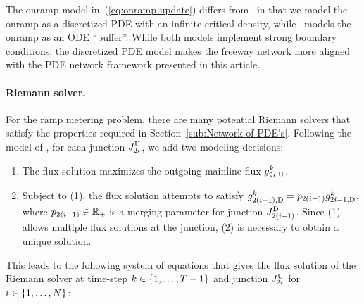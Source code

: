 The onramp model in~(\ref{eq:onramp-update}) differs from~\cite{Monache2013,Walid}
in that we model the onramp as a discretized PDE with an infinite
critical density, while~\cite{Monache2013,Walid} models the onramp
as an ODE ``buffer''. While both models implement strong boundary
conditions, the discretized PDE model makes the freeway network more
aligned with the PDE network framework presented in this article.


\paragraph{Riemann solver.}

For the ramp metering problem, there are many potential Riemann solvers
that satisfy the properties required in Section~\ref{sub:Network-of-PDE's}.
Following the model of \cite{Walid,ML}, for each junction $J_{2i}^{\text{U}}$,
we add two modeling decisions:
\begin{enumerate}
\item The flux solution maximizes the outgoing mainline flux $g_{2i,\text{U}}^{k}$.
\item Subject to (1), the flux solution attempts to satisfy $\fout{2\left(\link-1\right)}{\tind}=p_{2(\link-1)}\fout{2\link-1}{\tind}$,
where $p_{2(i-1)}\in\mathbb{R}_{+}$ is a merging parameter for
junction $\jdown{2\left(\link-1\right)}$. Since (1) allows multiple
flux solutions at the junction, (2) is necessary to obtain a unique
solution.
\end{enumerate}
This leads to the following system of equations that gives the flux
solution of the Riemann solver at time-step $k\in\intrange 1{\ntime-1}$
and junction $J_{2i}^{\text{U}}$ for $\link\in\intrange 1{\nlinks}$:

